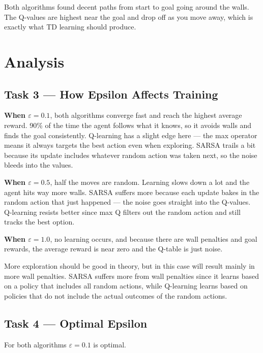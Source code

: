 \documentclass[11pt,a4paper]{article}
\begin{document}
Both algorithms found decent paths from start to goal going around the walls. The Q-values are highest near the goal and drop off as you move away, which is exactly what TD learning should produce.

\section{Analysis}

\subsection{Task 3 --- How Epsilon Affects Training}

\textbf{When $\varepsilon = 0.1$}, both algorithms converge fast and reach the highest average reward. 90\% of the time the agent follows what it knows, so it avoids walls and finds the goal consistently. Q-learning has a slight edge here --- the max operator means it always targets the best action even when exploring. SARSA trails a bit because its update includes whatever random action was taken next, so the noise bleeds into the values.

\textbf{When $\varepsilon = 0.5$}, half the moves are random. Learning slows down a lot and the agent hits way more walls. SARSA suffers more because each update bakes in the random action that just happened --- the noise goes straight into the Q-values. Q-learning resists better since max Q filters out the random action and still tracks the best option.

\textbf{When $\varepsilon = 1.0$}, no learning occurs, and because there are wall penalties and goal rewards, the average reward is near zero and the Q-table is just noise.

More exploration should be good in theory, but in this case will result mainly in more wall penalties. SARSA suffers more from wall penalties since it learns based on a policy that includes all random actions, while Q-learning learns based on policies that do not include the actual outcomes of the random actions.

\subsection{Task 4 --- Optimal Epsilon}

For both algorithms \textbf{$\varepsilon = 0.1$} is optimal.
\end{document}
